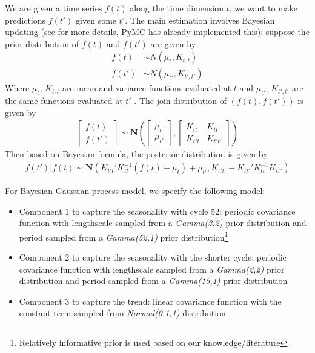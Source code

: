 \documentclass[letterpaper,12pt]{article}
\begin{document}
We are given a time series $f(t)$ along the time dimension $t$, we want to make predictions $f(t')$ given some $t'$. The main estimation involves Bayesian updating (see \cite{williams2006gaussian} for more details, PyMC has already implemented this): suppose the prior distribution of $f(t)$ and $f(t')$ are given by 
\begin{align*}
f(t)&\sim N(\mu_{t},K_{t,t}) \\
f(t')&\sim N(\mu_{t'},K_{t',t'})
\end{align*}
Where $\mu_{t}$, $K_{t,t}$ are mean and variance functions evaluated at $t$ and  $\mu_{t'}$, $K_{t',t'}$ are the same functions evaluated at $t'$ . The join distribution of $(f(t),f(t'))$ is given by 
\begin{align*}
\begin{bmatrix} f(t)  \\ f(t')  \end{bmatrix}
\sim 
\mathbf{N}(\begin{bmatrix}
	\mu_{t} \\
	\mu_{t'}
\end{bmatrix}, 
\begin{bmatrix}
	K_{tt} & K_{tt'} \\
	K_{t't} & K_{t't'}
\end{bmatrix})
\end{align*}
Then based on Bayesian formula, the posterior distribution is given by 
\begin{align*}
f(t')|f(t)\sim \mathbf{N}(K_{t't}'K_{tt}^{-1}(f(t)-\mu_{t})+\mu_{t'},K_{t't'}-K_{tt'}'K_{tt}^{-1}K_{tt'})
\end{align*}

For Bayesian Gaussian process model, we specify the following model:
\begin{itemize}
\item Component 1 to capture the seasonality with cycle 52: periodic covariance function with lengthscale sampled from a \emph{Gamma(2,2)} prior distribution and period sampled from a \emph{Gamma(52,1)} prior distribution\footnote{Relatively informative prior is used based on our knowledge/literature}
\item Component 2 to capture the seasonality with the shorter cycle: periodic covariance function with lengthscale sampled from a \emph{Gamma(2,2)} prior distribution and period sampled from a \emph{Gamma(15,1)} prior distribution
\item Component 3 to capture the trend: linear covariance function with the constant term sampled from \emph{Normal(0.1,1)} distribution
\end{itemize} 
\end{document}
